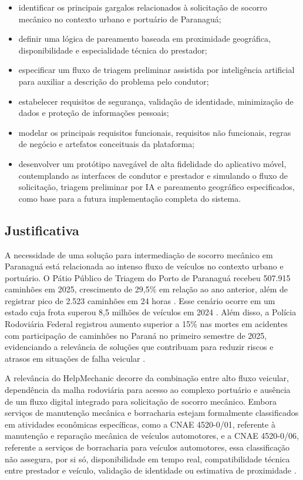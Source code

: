 \documentclass[12pt, a4paper]{article}
\begin{document}
\begin{itemize}
    \item[a)] identificar os principais gargalos relacionados à solicitação de socorro mecânico no contexto urbano e portuário de Paranaguá;
    \item[b)] definir uma lógica de pareamento baseada em proximidade geográfica, disponibilidade e especialidade técnica do prestador;
    \item[c)] especificar um fluxo de triagem preliminar assistida por inteligência artificial para auxiliar a descrição do problema pelo condutor;
    \item[d)] estabelecer requisitos de segurança, validação de identidade, minimização de dados e proteção de informações pessoais;
    \item[e)] modelar os principais requisitos funcionais, requisitos não funcionais, regras de negócio e artefatos conceituais da plataforma;
    \item[f)] desenvolver um protótipo navegável de alta fidelidade do aplicativo móvel, contemplando as interfaces de condutor e prestador e simulando o fluxo de solicitação, triagem preliminar por IA e pareamento geográfico especificados, como base para a futura implementação completa do sistema.
\end{itemize}

\subsection{Justificativa}
A necessidade de uma solução para intermediação de socorro mecânico em Paranaguá está relacionada ao intenso fluxo de veículos no contexto urbano e portuário. O Pátio Público de Triagem do Porto de Paranaguá recebeu 507.915 caminhões em 2025, crescimento de 29,5\% em relação ao ano anterior, além de registrar pico de 2.523 caminhões em 24 horas \cite{portosparana2026}. Esse cenário ocorre em um estado cuja frota superou 8,5 milhões de veículos em 2024 \cite{fetranspar2024}. Além disso, a Polícia Rodoviária Federal registrou aumento superior a 15\% nas mortes em acidentes com participação de caminhões no Paraná no primeiro semestre de 2025, evidenciando a relevância de soluções que contribuam para reduzir riscos e atrasos em situações de falha veicular \cite{prf2025}.

A relevância do HelpMechanic decorre da combinação entre alto fluxo veicular, dependência da malha rodoviária para acesso ao complexo portuário e ausência de um fluxo digital integrado para solicitação de socorro mecânico. Embora serviços de manutenção mecânica e borracharia estejam formalmente classificados em atividades econômicas específicas, como a CNAE 4520-0/01, referente à manutenção e reparação mecânica de veículos automotores, e a CNAE 4520-0/06, referente a serviços de borracharia para veículos automotores, essa classificação não assegura, por si só, disponibilidade em tempo real, compatibilidade técnica entre prestador e veículo, validação de identidade ou estimativa de proximidade \cite{concla_ibge_mecanica, concla_ibge_borracharia}.
\end{document}
